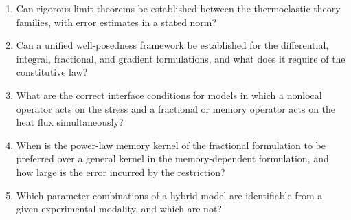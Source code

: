 \begin{enumerate}[label=\textbf{OQ11.\arabic*}]
\item Can rigorous limit theorems be established between the thermoelastic theory families, with error estimates in a stated norm? \label{oq:11.1}
\item Can a unified well-posedness framework be established for the differential, integral, fractional, and gradient formulations, and what does it require of the constitutive law? \label{oq:11.2}
\item What are the correct interface conditions for models in which a nonlocal operator acts on the stress and a fractional or memory operator acts on the heat flux simultaneously? \label{oq:11.3}
\item When is the power-law memory kernel of the fractional formulation to be preferred over a general kernel in the memory-dependent formulation, and how large is the error incurred by the restriction? \label{oq:11.4}
\item Which parameter combinations of a hybrid model are identifiable from a given experimental modality, and which are not? \label{oq:11.5}
\end{enumerate}

